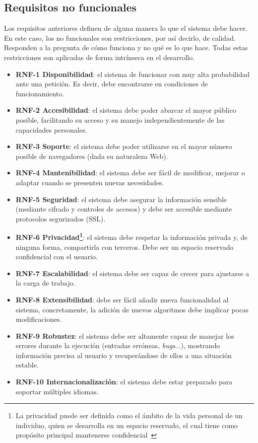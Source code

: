 \subsection{Requisitos no funcionales}
Los requisitos anteriores definen de alguna manera lo que el sistema debe hacer.
En este caso, los no funcionales son restricciones, por así decirlo, de calidad.
Responden a la pregunta de cómo funciona y no qué es lo que hace. Todas estas
restricciones son aplicadas de forma intrínseca en el desarrollo.

\begin{itemize}
	\item \textbf{RNF-1 Disponibilidad}: el sistema de funcionar con muy alta
	probabilidad ante una petición. Es decir, debe encontrarse en condiciones de
	funcionamiento.
	\item \textbf{RNF-2 Accesibilidad}: el sistema debe poder abarcar el mayor
	público posible, facilitando su acceso y su manejo independientemente de las
	capacidades personales.
    \item \textbf{RNF-3 Soporte}: el sistema debe poder utilizarse en el mayor
    número posible de navegadores (dada su naturaleza Web).
	\item \textbf{RNF-4 Mantenibilidad}: el sistema debe ser fácil de modificar,
	mejorar o adaptar cuando se presenten nuevas necesidades.
	\item \textbf{RNF-5 Seguridad}: el sistema debe asegurar la información
	sensible (mediante cifrado y controles de accesos) y debe ser accesible
	mediante protocolos segurizados (SSL).
	\item \textbf{RNF-6 Privacidad\footnote{La privacidad puede ser definida
	como el ámbito de la vida personal de un individuo, quien se desarrolla en
	un espacio reservado, el cual tiene como propósito principal mantenerse
	confidencial~\cite{eswiki:148719517}}}: el sistema debe respetar la
	información privada y, de ninguna forma, compartirla con terceros. Debe ser
	un espacio reservado confidencial con el usuario.
	\item \textbf{RNF-7 Escalabilidad}: el sistema debe ser capaz de crecer para
	ajustarse a la carga de trabajo.
	\item \textbf{RNF-8 Extensibilidad}: debe ser fácil añadir nueva
	funcionalidad al sistema, concretamente, la adición de nuevos algoritmos
	debe implicar pocas modificaciones.
	\item \textbf{RNF-9 Robustez}: el sistema debe ser altamente capaz de
	manejar los errores durante la ejecución (entradas erróneas,
	\textit{bugs}...), mostrando información precisa al usuario y recuperándose
	de ellos a una situación estable.
	\item \textbf{RNF-10 Internacionalización}: el sistema debe estar preparado
	para soportar múltiples idiomas.

\end{itemize}


